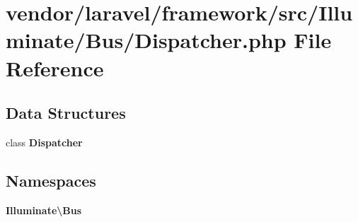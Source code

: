 \section{vendor/laravel/framework/src/\+Illuminate/\+Bus/\+Dispatcher.php File Reference}
\label{_bus_2_dispatcher_8php}
\subsection*{Data Structures}
\begin{DoxyCompactItemize}
\item 
class {\bf Dispatcher}
\end{DoxyCompactItemize}
\subsection*{Namespaces}
\begin{DoxyCompactItemize}
\item 
 {\bf Illuminate\textbackslash{}\+Bus}
\end{DoxyCompactItemize}
